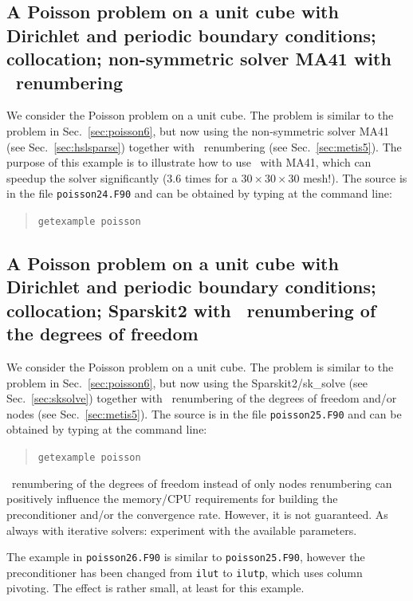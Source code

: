 \subsection{A Poisson problem on a unit cube with Dirichlet
            and periodic boundary conditions; collocation; non-symmetric solver MA41 with \metis\ renumbering}
\label{sec:poisson24}

We consider the Poisson problem on a unit cube. The problem is similar to
the problem in Sec.~\ref{sec:poisson6}, but now using the non-symmetric 
solver MA41 (see Sec.~\ref{sec:hslsparse}) together with \metis\ renumbering (see Sec.~\ref{sec:metis5}). The purpose of this example is to illustrate how to use \metis\ with MA41, which can speedup the solver significantly ($3.6$ times for a $30\times30\times30$ mesh!). The source is in the file \texttt{poisson24.F90}
and can be obtained by typing at the
command line:
\begin{quote}
   \texttt{getexample poisson}
\end{quote}

\subsection{A Poisson problem on a unit cube with Dirichlet
            and periodic boundary conditions; collocation; Sparskit2 with \metis\ renumbering of the degrees of freedom}
\label{sec:poisson25}

We consider the Poisson problem on a unit cube. The problem is similar to
the problem in Sec.~\ref{sec:poisson6}, but now using the Sparskit2/sk\_solve (see Sec.~\ref{sec:sksolve})
together with \metis\ renumbering of the degrees of freedom and/or nodes (see Sec.~\ref{sec:metis5}). The source is in the file \texttt{poisson25.F90}
and can be obtained by typing at the
command line:
\begin{quote}
   \texttt{getexample poisson}
\end{quote}

\metis\ renumbering of the degrees of freedom instead of only nodes renumbering can positively influence 
the memory/CPU requirements for building the preconditioner and/or the convergence rate. However, it is not guaranteed. As always with iterative solvers: experiment with the available parameters.

The example in \texttt{poisson26.F90} is similar to \texttt{poisson25.F90}, however the preconditioner has
been changed from \texttt{ilut} to \texttt{ilutp}, which uses column pivoting. The effect is rather small, at least for this example.
